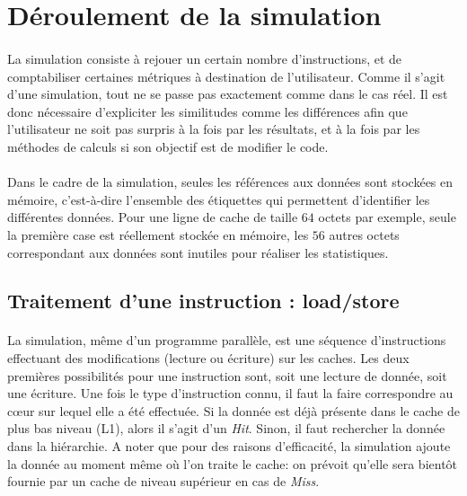 \section{Déroulement de la simulation}

\paragraph{}
La simulation consiste à rejouer un certain nombre d'instructions, et de comptabiliser certaines métriques à destination de l'utilisateur. Comme il s'agit d'une simulation, tout ne se passe pas exactement comme dans le cas réel. Il est donc nécessaire d'expliciter les similitudes comme les différences afin que l'utilisateur ne soit pas surpris à la fois par les résultats, et à la fois par les méthodes de calculs si son objectif est de modifier le code.

\paragraph{}
Dans le cadre de la simulation, seules les références aux données sont stockées en mémoire, c'est-à-dire l'ensemble des étiquettes qui permettent d'identifier les différentes données. Pour une ligne de cache de taille $64$ octets par exemple, seule la première case est réellement stockée en mémoire, les $56$ autres octets correspondant aux données sont inutiles pour réaliser les statistiques.

\subsection{Traitement d'une instruction : load/store}

\paragraph{}
La simulation, même d'un programme parallèle, est une séquence d'instructions effectuant des modifications (lecture ou écriture) sur les caches. Les deux premières possibilités pour une instruction sont, soit une lecture de donnée, soit une écriture. Une fois le type d'instruction connu, il faut la faire correspondre au c{\oe}ur sur lequel elle a été effectuée. Si la donnée est déjà présente dans le cache de plus bas niveau (L1), alors il s'agit d'un \emph{Hit}. Sinon, il faut rechercher la donnée dans la hiérarchie. A noter que pour des raisons d'efficacité, la simulation ajoute la donnée au moment même où l'on traite le cache: on prévoit qu'elle sera bientôt fournie par un cache de niveau supérieur en cas de \emph{Miss}.

